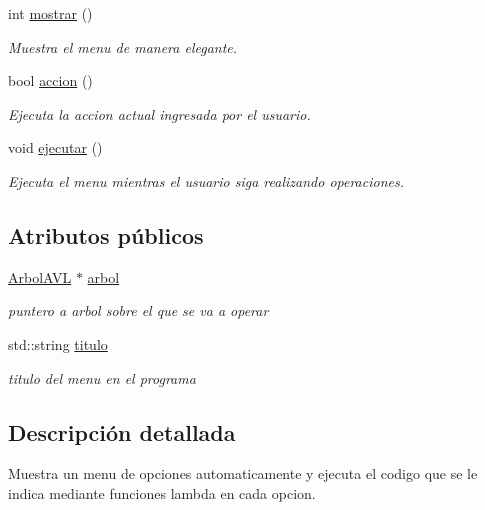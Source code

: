 \begin{DoxyCompactItemize}
int \hyperlink{classMenu_a909877f977f662803994c67e862b4b87}{mostrar} ()
\begin{DoxyCompactList}\small\item\em Muestra el menu de manera elegante. \end{DoxyCompactList}\item 
bool \hyperlink{classMenu_ab5609ebe5415d2e5f06143819b832981}{accion} ()
\begin{DoxyCompactList}\small\item\em Ejecuta la accion actual ingresada por el usuario. \end{DoxyCompactList}\item 
\mbox{\label{classMenu_aa6be64bbaaaa59e535507d868cc9740f}} 
void \hyperlink{classMenu_aa6be64bbaaaa59e535507d868cc9740f}{ejecutar} ()
\begin{DoxyCompactList}\small\item\em Ejecuta el menu mientras el usuario siga realizando operaciones. \end{DoxyCompactList}\end{DoxyCompactItemize}
\subsection*{Atributos públicos}
\begin{DoxyCompactItemize}
\item 
\mbox{\label{classMenu_a0b2445d309a32befdc877e64f555a024}} 
\hyperlink{classArbolAVL}{Arbol\+A\+VL} $\ast$ \hyperlink{classMenu_a0b2445d309a32befdc877e64f555a024}{arbol}
\begin{DoxyCompactList}\small\item\em puntero a arbol sobre el que se va a operar \end{DoxyCompactList}\item 
\mbox{\label{classMenu_a16f1a749e7d6f35d9c1b4b7ae93b204f}} 
std\+::string \hyperlink{classMenu_a16f1a749e7d6f35d9c1b4b7ae93b204f}{titulo}
\begin{DoxyCompactList}\small\item\em titulo del menu en el programa \end{DoxyCompactList}\end{DoxyCompactItemize}


\subsection{Descripción detallada}
Muestra un menu de opciones automaticamente y ejecuta el codigo que se le indica mediante funciones lambda en cada opcion. 

